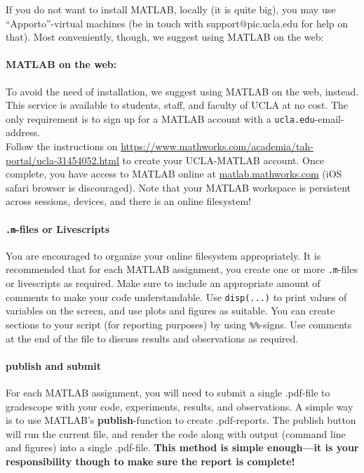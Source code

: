 \documentclass[11pt,letter]{article}
\begin{document}
If you do not want to install MATLAB, locally (it is quite big), you may use ``Apporto''-virtual machines (be in touch with support@pic.ucla.edu for help on that). Most conveniently, though, we suggest using MATLAB on the web: 

\paragraph{MATLAB on the web:}
To avoid the need of installation, we suggest using MATLAB on the web, instead. This service is available to students, staff, and faculty of UCLA at no cost. The only requirement is to sign up for a MATLAB account with a \texttt{ucla.edu}-email-address.\\

Follow the instructions on \url{https://www.mathworks.com/academia/tah-portal/ucla-31454052.html} to create your UCLA-MATLAB account. Once complete, you have access to MATLAB online at \url{matlab.mathworks.com} (iOS safari browser is discouraged).
Note that your MATLAB workspace is persistent across sessions, devices, and there is an online filesystem!

\paragraph{\texttt{.m}-files or Livescripts}
You are encouraged to organize your online filesystem appropriately. It is recommended that for each MATLAB assignment, you create one or more \texttt{.m}-files or livescripts as required. Make sure to include an appropriate amount of comments to make your code understandable. Use \texttt{disp(...)} to print values of variables on the screen, and use plots and figures as suitable. You can create sections to your script (for reporting purposes) by using \texttt{\%\%}-signs. Use comments at the end of the file to discuss results and observations as required. 

\paragraph{publish and submit}
For each MATLAB assignment, you will need to submit a single .pdf-file to gradescope with your code, experiments, results, and observations. A simple way is to use MATLAB's \textbf{publish}-function to create .pdf-reports. The publish button will run the current file, and render the code along with output (command line and figures) into a single .pdf-file. \textbf{This method is simple enough---it is your responsibility though to make sure the report is complete!}
\end{document}
